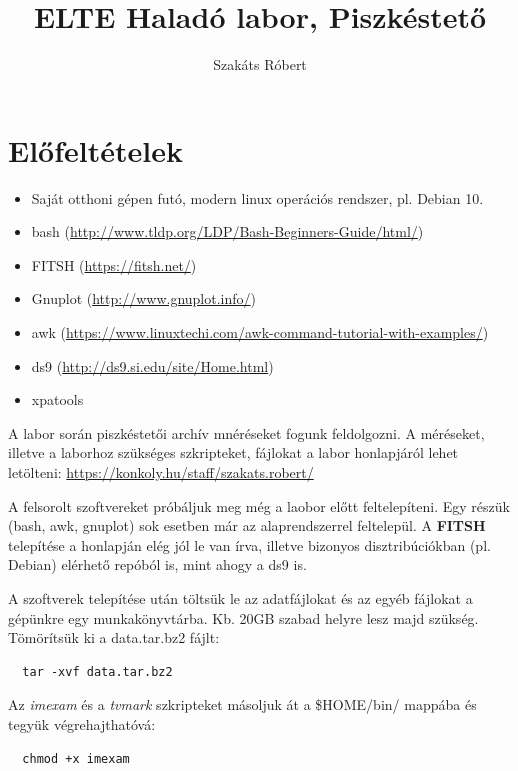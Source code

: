 \documentclass{article}
\begin{document}
\title{ELTE Haladó labor, Piszkéstető}
\author{Szakáts Róbert}

\maketitle
\tableofcontents
\newpage

\section{Előfeltételek}

\begin{itemize}
  \item Saját otthoni gépen futó, modern linux operációs rendszer, pl. Debian 10.
  \item bash (\url{http://www.tldp.org/LDP/Bash-Beginners-Guide/html/})
  \item FITSH (\url{https://fitsh.net/})
  \item Gnuplot (\url{http://www.gnuplot.info/})
  \item awk (\url{https://www.linuxtechi.com/awk-command-tutorial-with-examples/})
  \item ds9 (\url{http://ds9.si.edu/site/Home.html})
  \item xpatools
\end{itemize}

A labor során piszkéstetői archív mnéréseket fogunk feldolgozni. A méréseket,
illetve a laborhoz szükséges szkripteket, fájlokat a labor honlapjáról lehet
letölteni:
\url{https://konkoly.hu/staff/szakats.robert/}

A felsorolt szoftvereket próbáljuk meg még a laobor előtt feltelepíteni.
Egy részük (bash, awk, gnuplot) sok esetben már az alaprendszerrel feltelepül.
A {\bf{FITSH}} telepítése a honlapján elég jól le van írva, illetve bizonyos
disztribúciókban (pl. Debian) elérhető repóból is, mint ahogy a ds9 is.

A szoftverek telepítése után töltsük le az adatfájlokat és az egyéb fájlokat a
gépünkre egy munkakönyvtárba. Kb. 20GB szabad helyre lesz majd szükség.
Tömörítsük ki a data.tar.bz2 fájlt:
\begin{verbatim}
  tar -xvf data.tar.bz2
\end{verbatim}


Az {\it imexam} és a {\it tvmark} szkripteket másoljuk át a \$HOME/bin/ mappába
és tegyük végrehajthatóvá:
\begin{verbatim}
  chmod +x imexam
\end{verbatim}
\end{document}
